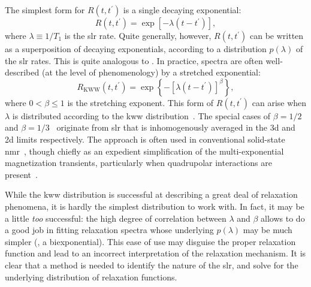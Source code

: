 The simplest form for $R \left (t, t^{\prime} \right )$ is a single decaying exponential: 
%
\begin{equation} \label{eq:slr-integral}
   R \left (t, t^{\prime} \right ) = \exp \left [-  \lambda \left ( t - t^{\prime} \right ) \right ],
\end{equation}
%
where $\lambda \equiv 1 / T_{1}$ is the \gls{slr} rate. Quite generally, however, $R \left (t, t^{\prime} \right )$ can be written as a superposition of decaying exponentials, according to a distribution $p(\lambda)$ of the \gls{slr} rates.
This is quite analogous to .
In practice, spectra are often well-described (at the level of phenomenology) by a stretched exponential:
%
\begin{equation} \label{eq:slr-stretched}
   R_\mathrm{KWW} \left ( t, t^{\prime} \right ) = \exp \left \{ - \left  [ \lambda \left ( t-t^{\prime} \right ) \right ]^{\beta} \right \},
\end{equation}
%
where $0 < \beta \leq 1$ is the stretching exponent.
This form of $R \left ( t, t^{\prime} \right )$ can arise when $\lambda$ is distributed according to the \gls{kww} distribution~\cite{1854-Kohlrausch-AP-167-179, 1970-Williams-TFS-66-80, 1980-Lindsay-JCP-73-3348, 2006-Johnston-PRB-74-184430, 2016-Wu-SR-6-20506, 2006-Johnston-PRB-74-184430}.
The special cases of $\beta = 1/2$~\cite{1968-Tse-PRL-21-511, 1984-Stockmann-JNCS-66-501} and $\beta = 1/3$~\cite{1992-Bader-JPCM-4-4779} originate from \gls{slr} that is inhomogenously averaged in the \gls{3d} and \gls{2d} limits respectively.
The approach is often used in conventional solid-state \gls{nmr}~\cite{1995-Narayanan-JMRSA-112-58}, though chiefly as an expedient simplification of the multi-exponential magnetization transients, particularly when quadrupolar interactions are present~\cite{1995-McDowell-JMRSA-113-242}.

While the \gls{kww} distribution is successful at describing a great deal of relaxation phenomena, it is hardly the simplest distribution to work with.
In fact, it may be a little \emph{too} successful:
the high degree of correlation between $\lambda$ and $\beta$ allows  to do a good job in fitting relaxation spectra whose underlying $p ( \lambda )$ may be much simpler (, a biexponential).
This ease of use may disguise the proper relaxation function and lead to an incorrect interpretation of the relaxation mechanism. It is clear that a method is needed to identify the nature of the \gls{slr}, and solve for the underlying distribution of relaxation functions.

